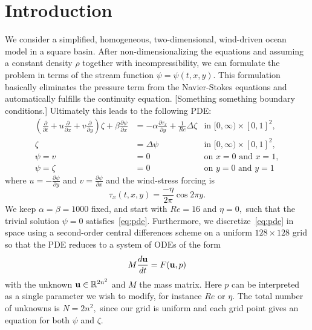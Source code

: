 \section{Introduction}
We consider a simplified, homogeneous, two-dimensional, wind-driven ocean model in a square basin. After non-dimensionalizing the equations and assuming a constant density $\rho$ together with incompressibility, we can formulate the problem in terms of the stream function $\psi = \psi(t, x, y).$ This formulation basically eliminates the pressure term from the Navier-Stokes equations and automatically fulfills the continuity equation. [Something something boundary conditions.] Ultimately this leads to the following PDE:
\begin{equation}\label{eq:pde}
\begin{aligned}
  \left(\frac{\partial}{\partial t} + u \frac{\partial}{\partial x} + v \frac{\partial}{\partial y}\right) \zeta + \beta \frac{\partial \psi}{\partial x} &= -\alpha \frac{\partial \tau_x}{\partial y} + \frac{1}{Re} \Delta \zeta & \text{in } [0, \infty) \times [0,1]^2, \\
  \zeta &= \Delta \psi & \text{in } [0, \infty) \times [0,1]^2, \\
  \psi = v &= 0 & \text{on } x = 0 \text{ and } x = 1, \\
  \psi = \zeta &= 0 & \text{on } y = 0 \text{ and } y = 1
\end{aligned}
\end{equation}
where $u = -\frac{\partial \psi}{\partial y}$ and $v = \frac{\partial \psi}{\partial x}$ and the wind-stress forcing is
\begin{equation}
  \tau_x(t, x, y) = \frac{- \eta}{2 \pi} \cos{2\pi y}.
 \label{eq:tau}
\end{equation}
We keep $\alpha = \beta = 1000$ fixed, and start with $Re = 16$ and $\eta = 0,$ such that the trivial solution $\psi = 0$ satisfies~\eqref{eq:pde}. Furthermore, we discretize~\eqref{eq:pde} in space using a second-order central differences scheme on a uniform $128\times128$ grid so that the PDE reduces to a system of ODEs of the form
\begin{equation}\label{eq:ode}
  M \frac{d \mathbf{u}}{d t} = F(\mathbf{u}, p)
\end{equation}
with the unknown $\mathbf{u} \in \mathbb{R}^{2n^2}$ and $M$ the mass matrix. Here $p$ can be interpreted as a single parameter we wish to modify, for instance $Re$ or $\eta.$ The total number of unknowns is $N = 2 n^2,$ since our grid is uniform and each grid point gives an equation for both $\psi$ and $\zeta.$

